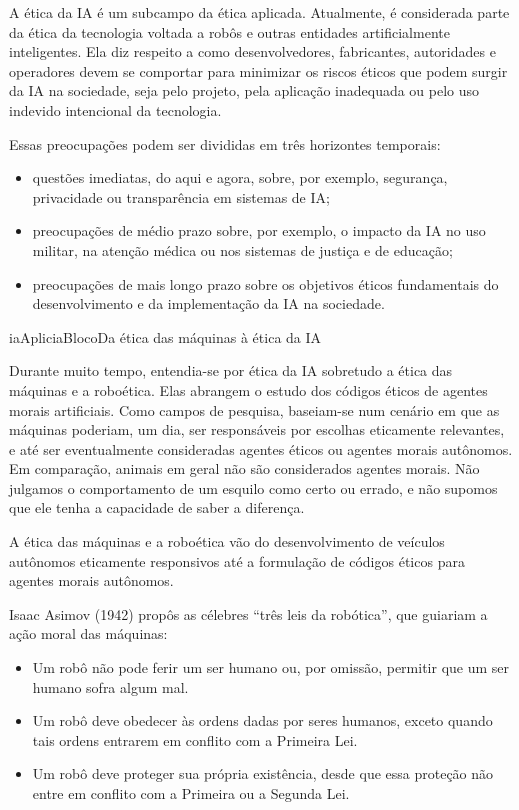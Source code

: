 \documentclass[
  11pt,
]{article}
\providecommand{\tightlist}{%
  \setlength{\itemsep}{0pt}\setlength{\parskip}{0pt}}
\newenvironment{contexto}[1][Contexto]{\begin{iabox}{iaAplic}{iaBloco}{#1}}{\end{iabox}}
\begin{document}
A ética da IA é um subcampo da ética aplicada. Atualmente, é considerada
parte da ética da tecnologia voltada a robôs e outras entidades
artificialmente inteligentes. Ela diz respeito a como desenvolvedores,
fabricantes, autoridades e operadores devem se comportar para minimizar
os riscos éticos que podem surgir da IA na sociedade, seja pelo projeto,
pela aplicação inadequada ou pelo uso indevido intencional da
tecnologia.

Essas preocupações podem ser divididas em três horizontes temporais:

\begin{itemize}
\tightlist
\item
  questões imediatas, do aqui e agora, sobre, por exemplo, segurança,
  privacidade ou transparência em sistemas de IA;
\item
  preocupações de médio prazo sobre, por exemplo, o impacto da IA no uso
  militar, na atenção médica ou nos sistemas de justiça e de educação;
\item
  preocupações de mais longo prazo sobre os objetivos éticos
  fundamentais do desenvolvimento e da implementação da IA na sociedade.
\end{itemize}

\begin{contexto}[Da ética das máquinas à ética da IA]

Durante muito tempo, entendia-se por ética da IA sobretudo a ética das
máquinas e a roboética. Elas abrangem o estudo dos códigos éticos de
agentes morais artificiais. Como campos de pesquisa, baseiam-se num
cenário em que as máquinas poderiam, um dia, ser responsáveis por
escolhas eticamente relevantes, e até ser eventualmente consideradas
agentes éticos ou agentes morais autônomos. Em comparação, animais em
geral não são considerados agentes morais. Não julgamos o comportamento
de um esquilo como certo ou errado, e não supomos que ele tenha a
capacidade de saber a diferença.

A ética das máquinas e a roboética vão do desenvolvimento de veículos
autônomos eticamente responsivos até a formulação de códigos éticos para
agentes morais autônomos.

Isaac Asimov (1942) propôs as célebres ``três leis da robótica'', que
guiariam a ação moral das máquinas:

\begin{itemize}
\item
  Um robô não pode ferir um ser humano ou, por omissão, permitir que um
  ser humano sofra algum mal.
\item
  Um robô deve obedecer às ordens dadas por seres humanos, exceto quando
  tais ordens entrarem em conflito com a Primeira Lei.
\item
  Um robô deve proteger sua própria existência, desde que essa proteção
  não entre em conflito com a Primeira ou a Segunda Lei.
\end{itemize}

\end{contexto}
\end{document}
